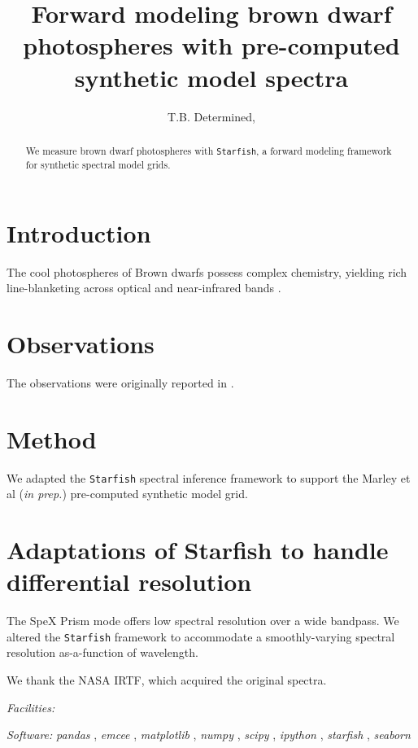 \documentclass[twocolumn]{emulateapj}%
\newcommand{\project}[1]{\textsl{#1}}
\begin{document}
 
\title{Forward modeling brown dwarf photospheres with pre-computed synthetic model spectra}

\author{T.B. Determined,}



\begin{abstract}
We measure brown dwarf photospheres with \texttt{Starfish}, a forward modeling framework for synthetic spectral model grids.
\end{abstract}


\maketitle

\section{Introduction}\label{sec:intro}
The cool photospheres of Brown dwarfs possess complex chemistry, yielding rich line-blanketing across optical and near-infrared bands \citep{2015ARA&A..53..279M}.


\section{Observations}
The observations were originally reported in \citet{2016arXiv161202809L}.

\section{Method}
We adapted the \texttt{Starfish} spectral inference framework \citep{czekala16, 2017ApJ...836..200G} to support the Marley et al (\emph{in prep.}) pre-computed synthetic model grid.

\appendix

\section{Adaptations of Starfish to handle differential resolution}

The SpeX Prism mode offers low spectral resolution over a wide bandpass.  We altered the \texttt{Starfish} framework to accommodate a smoothly-varying spectral resolution as-a-function of wavelength.

\acknowledgements
We thank the NASA IRTF, which acquired the original spectra.

{\it Facilities:} 

{\it Software: } 
 \project{pandas} \citep{mckinney10},
 \project{emcee} \citep{foreman13},
 \project{matplotlib} \citep{hunter07},
 \project{numpy} \citep{vanderwalt11},
 \project{scipy} \citep{jones01},
 \project{ipython} \citep{perez07},
 \project{starfish} \citep{czekala15},
 \project{seaborn} \citep{waskom14}

\clearpage



\end{document}
